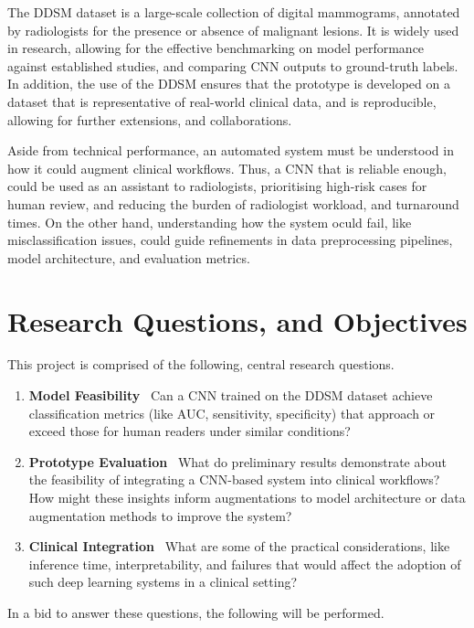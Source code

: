 \documentclass[main]{subfiles}
\begin{document}
The DDSM dataset is a large-scale collection of digital mammograms, annotated by radiologists for the presence or absence of malignant lesions. It is widely used in research, allowing for the effective benchmarking on model performance against established studies, and comparing CNN outputs to ground-truth labels. In addition, the use of the DDSM ensures that the prototype is developed on a dataset that is representative of real-world clinical data, and is reproducible, allowing for further extensions, and collaborations.

Aside from technical performance, an automated system must be understood in how it could augment clinical workflows. Thus, a CNN that is reliable enough, could be used as an assistant to radiologists, prioritising high-risk cases for human review, and reducing the burden of radiologist workload, and turnaround times. On the other hand, understanding how the system oculd fail, like misclassification issues, could guide refinements in data preprocessing pipelines, model architecture, and evaluation metrics.

\section{Research Questions, and Objectives}
\label{sec:intro_research_questions}
This project is comprised of the following, central research questions.

\begin{enumerate}
	\item \textbf{Model Feasibility} \textemdash\ Can a CNN trained on the DDSM dataset achieve classification metrics (like AUC, sensitivity, specificity) that approach or exceed those for human readers under similar conditions?
	\item \textbf{Prototype Evaluation} \textemdash\ What do preliminary results demonstrate about the feasibility of integrating a CNN-based system into clinical workflows? How might these insights inform augmentations to model architecture or data augmentation methods to improve the system?
	\item \textbf{Clinical Integration} \textemdash\ What are some of the practical considerations, like inference time, interpretability, and failures that would affect the adoption of such deep learning systems in a clinical setting?
\end{enumerate}

In a bid to answer these questions, the following will be performed.
\end{document}
